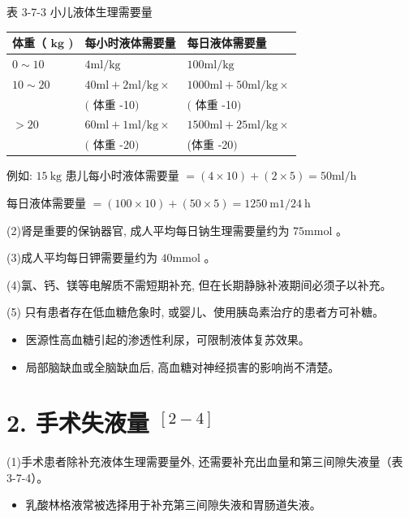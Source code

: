 \documentclass[10pt]{article}
\begin{document}
表 3-7-3 小儿液体生理需要量

\begin{center}
\begin{tabular}{lll}
\hline
体重（ $\mathbf{k g}$ ) & 每小时液体需要量 & 每日液体需要量 \\
\hline
$0 \sim 10$ & $4 \mathrm{ml} / \mathrm{kg}$ & $100 \mathrm{ml} / \mathrm{kg}$ \\
$10 \sim 20$ & $40 \mathrm{ml}+2 \mathrm{ml} / \mathrm{kg} \times$ & $1000 \mathrm{ml}+50 \mathrm{ml} / \mathrm{kg} \times$ \\
 & $($ 体重 -10$)$ & $($ 体重 -10$)$ \\
$>20$ & $60 \mathrm{ml}+1 \mathrm{ml} / \mathrm{kg} \times$ & $1500 \mathrm{ml}+25 \mathrm{ml} / \mathrm{kg} \times$ \\
 & $($ 体重 -20$)$ & (体重 -20$)$ \\
\hline
\end{tabular}
\end{center}

例如: $15 \mathrm{~kg}$ 患儿每小时液体需要量 $=(4 \times 10)+(2 \times 5)=50 \mathrm{ml} / \mathrm{h}$

每日液体需要量 $=(100 \times 10)+(50 \times 5)=1250 \mathrm{~m} 1 / 24 \mathrm{~h}$

(2)肾是重要的保钠器官, 成人平均每日钠生理需要量约为 $75 \mathrm{mmol}$ 。

(3)成人平均每日钾需要量约为 $40 \mathrm{mmol}$ 。

(4)氯、钙、镁等电解质不需短期补充, 但在长期静脉补液期间必须子以补充。

(5) 只有患者存在低血糖危象时, 或婴儿、使用胰岛素治疗的患者方可补糖。

\begin{itemize}
  \item 医源性高血糖引起的渗透性利尿，可限制液体复苏效果。
  \item 局部脑缺血或全脑缺血后, 高血糖对神经损害的影响尚不清楚。
\end{itemize}

\section*{2. 手术失液量 ${ }^{[2-4]}$}
(1)手术患者除补充液体生理需要量外, 还需要补充出血量和第三间隙失液量（表 3-7-4）。

\begin{itemize}
  \item 乳酸林格液常被选择用于补充第三间隙失液和胃肠道失液。
\end{itemize}
\end{document}

